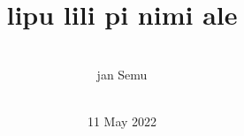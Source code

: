 \documentclass[statementpaper,oneside,article,14pt]{memoir}
\newcommand{\BackgroundPic}[1]{%
\put(0,0){%
\parbox[b][\paperheight]{\paperwidth}{%
\vfill
\centering
{\transparent{0.4} \texttt{[image: \#1]}}%
\vfill
}}}
\begin{document}
\newcommand{\nimi}[3]{\item[{\sitpon#1} #2] #3}


\title{{} \\ lipu lili pi nimi ale}
\author{{\sitpon󱤑󱦐󱥚󱤉󱤻󱥱󱦑} \\ jan Semu}
\date{{\sitpon󱥤󱤤󱦓󱥫󱤣󱦓󱥜󱤻󱦓󱥜󱥣󱥇} \\ 11 May 2022}

\begingroup
\let\cleardoublepage\clearpage


\begin{titlingpage}
\maketitle


\end{titlingpage}

\endgroup

\pagestyle{empty}


\end{document}
